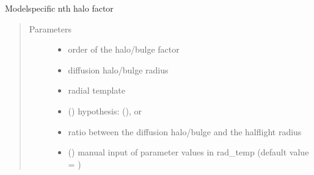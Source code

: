 \documentclass[letterpaper,10pt,english]{sphinxmanual}
\begin{document}
\begin{fulllineitems}
\label{\detokenize{diffsph.profiles:diffsph.profiles.massmodels.h}}
\sphinxAtStartPar
Model\sphinxhyphen{}specific n\sphinxhyphen{}th halo factor
\begin{quote}\begin{description}
\item[{Parameters}] \leavevmode\begin{itemize}
\item {} 
\sphinxAtStartPar
{} \textendash{} order of the halo/bulge factor

\item {} 
\sphinxAtStartPar
{} \textendash{} diffusion halo/bulge radius

\item {} 
\sphinxAtStartPar
{} \textendash{} radial template

\item {} 
\sphinxAtStartPar
{} () \textendash{} hypothesis:  (),  or 

\item {} 
\sphinxAtStartPar
{} \textendash{} ratio between the diffusion halo/bulge and the half\sphinxhyphen{}light radius

\item {} 
\sphinxAtStartPar
{} () \textendash{} manual input of parameter values in rad\_temp (default value = )

\end{itemize}

\end{description}\end{quote}


\end{fulllineitems}
\end{document}
